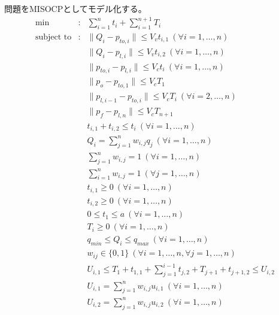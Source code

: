 \documentclass[11pt,a4paper,dvipdfmx,titlepage,uplatex]{jsarticle}
\theoremstyle{mystyle}
\newcommand{\0}{\mathbf{0}}
\begin{document}
	
	問題をMISOCPとしてモデル化する。
	\begin{eqnarray}
		\label{eq:formulation}
		\min & : & \sum_{i=1}^{n}t_i+\sum_{i=1}^{n+1}T_i \label{obj}\\
		\text{subject to} & : &\|Q_i - p_{to,i}\|\leq V_v t_{i, 1}\ (\forall i = 1,\dots ,n)\label{cst1}\\
		& & \|Q_i - p_{l,i}\|\leq V_v t_{i, 2}\ (\forall i = 1,\dots ,n)\label{cst2}\\
		& & \|p_{to,i} - p_{l,i}\|\leq V_c t_i\ (\forall i = 1,\dots ,n)\label{cst3}\\
		& & \|p_o - p_{to,1}\|\leq V_c T_1\label{cst4}\\
		& & \|p_{l,i-1}- p_{to,i}\|\leq V_c T_i\ (\forall i = 2,\dots ,n)\label{cst5}\\
		& & \|p_f- p_{l,n}\|\leq V_c T_{n+1}\ \label{cst6}\\
		& & t_{i,1}+t_{i,2}\leq t_i \ (\forall i = 1,\dots ,n)\label{cst7}\\
		& & Q_i = \sum^n_{j=1}{w_{i,j}q_j}\ (\forall i = 1,\dots ,n)\label{cst8}\\
		& & \sum^n_{j=1}{w_{i,j}} = 1\ (\forall i = 1,\dots ,n)\label{cst9}\\
		& & \sum^n_{i=1}{w_{i,j}} = 1\ (\forall j = 1,\dots ,n)\label{cst10}\\
		& & t_{i,1}\geq 0\ (\forall i = 1,\dots ,n)\label{cst11}\\
		& & t_{i,2}\geq 0\ (\forall i = 1,\dots ,n)\label{cst12}\\
		& & 0\leq t_1 \leq a \ (\forall i = 1,\dots ,n)\label{cst13}\\
		& & T_i\geq 0\ (\forall i = 1,\dots ,n)\label{cst14}\\
		& & q_{min}\leq Q_i \leq q_{max}\ (\forall i = 1,\dots ,n)\label{cst15}\\
		& & w_{ij} \in \{0,1\}\ (\forall i = 1,\dots ,n,\forall j = 1,\dots ,n)\label{cst16}\\
		& & U_{i,1} \leq T_1+t_{1,1}+ \sum_{j=1}^{i-1}{t_{j,2}+T_{j+1}+t_{j+1, 2}} \leq U_{i,2}\label{cst17}\\
		& & U_{i,1} = \sum^n_{j=1}{w_{i,j}u_{i,1}}\ (\forall i = 1,\dots ,n)\label{cst18}\\
		& & U_{i,2} = \sum^n_{j=1}{w_{i,j}u_{i,2}}\ (\forall i = 1,\dots ,n)\label{cst19}
	\end{eqnarray}
	
\end{document}
